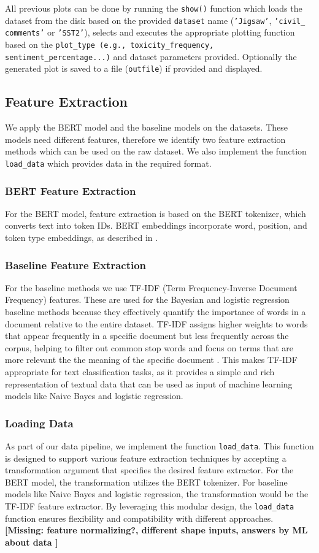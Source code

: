 \documentclass[10pt,a4paper,oneside]{article} %
\begin{document}
All previous plots can be done by running the \texttt{show()} function which loads the dataset from the disk based on the provided \texttt{dataset} name (\texttt{'Jigsaw'}, \texttt{'civil\_ comments'} or \texttt{'SST2'}), selects and executes the appropriate plotting function based on the \texttt{plot\_type (e.g., toxicity\_frequency, sentiment\_percentage...)} and dataset parameters provided. Optionally the generated plot is saved to a file (\texttt{outfile}) if provided and displayed.
\subsection{Feature Extraction}
We apply the BERT model and the baseline models on the datasets. These models need different features, therefore we identify two feature extraction methods which can be used on the raw dataset. We also implement the function \texttt{load\_data} which provides data in the required format.
\subsubsection{BERT Feature Extraction}
For the BERT model, feature extraction is based on the BERT tokenizer, which converts text into token IDs. BERT embeddings incorporate word, position, and token type embeddings, as described in \cite{kenton2019bert}. 
\subsubsection{Baseline Feature Extraction}
For the baseline methods we use TF-IDF (Term Frequency-Inverse Document Frequency) features. These are used for the Bayesian and logistic regression baseline methods because they effectively quantify the importance of words in a document relative to the entire dataset. TF-IDF assigns higher weights to words that appear frequently in a specific document but less frequently across the corpus, helping to filter out common stop words and focus on terms that are more relevant the the meaning of the specific document \citep{sparck1972statistical}. This makes TF-IDF appropriate for text classification tasks, as it provides a simple and rich representation of textual data that can be used as input of machine learning models like Naive Bayes and logistic regression.
\subsubsection{Loading Data}
As part of our data pipeline, we implement the function \texttt{load\_data}. This function is designed to support various feature extraction techniques by accepting a transformation argument that specifies the desired feature extractor. For the BERT model, the transformation utilizes the BERT tokenizer.  For baseline models like Naive Bayes and logistic regression, the transformation would be the TF-IDF feature extractor. By leveraging this modular design, the \verb|load_data| function ensures flexibility and compatibility with different approaches.
\textbf{[Missing: feature normalizing?, different shape inputs,  answers by ML about data ]}
\end{document}
